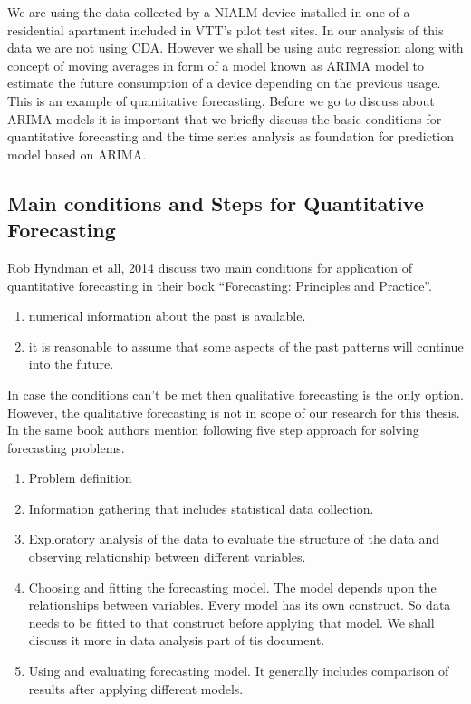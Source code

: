 We are using the data collected by a NIALM device installed in one of a residential apartment included in VTT's pilot test sites. In our analysis of this data we are not using CDA. However we shall be using auto regression along with concept of moving averages in form of a model known as ARIMA model to estimate the future consumption of a device depending on the previous usage. This is an example of quantitative forecasting. Before we go to discuss about ARIMA models it is important that we briefly discuss the basic conditions for quantitative forecasting and the time series analysis as foundation for prediction model based on ARIMA.
\subsection{Main conditions and Steps for Quantitative Forecasting}\label{conditions}
Rob Hyndman et all, 2014 discuss two main conditions for application of quantitative forecasting\cite{hyndman2014forecasting} in their book ``Forecasting: Principles and Practice''.
\begin{enumerate}
\item numerical information about the past is available.
\item it is reasonable to assume that some aspects of the past patterns will continue into the future.
\end{enumerate}
In case the conditions can't be met then qualitative forecasting is the only option. However, the qualitative forecasting is not in scope of our research for this thesis. In the same book authors mention following five step approach for solving forecasting problems.
\begin{enumerate}
\item Problem definition
\item Information gathering that includes statistical data collection.
\item Exploratory analysis of the data to evaluate the structure of the data and observing relationship between different variables.
\item Choosing and fitting the forecasting model. The model depends upon the relationships between variables. Every model has its own construct. So data needs to be fitted to that construct before applying that model. We shall discuss it more in data analysis part of tis document.
\item Using and evaluating forecasting model. It generally includes comparison of results after applying different models.  
\end{enumerate}    

